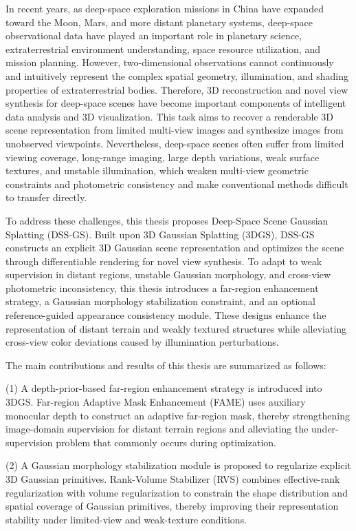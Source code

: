 \begin{engabstract}
    In recent years, as deep-space exploration missions in China have expanded toward the Moon, Mars, and more distant planetary systems, deep-space observational data have played an important role in planetary science, extraterrestrial environment understanding, space resource utilization, and mission planning. However, two-dimensional observations cannot continuously and intuitively represent the complex spatial geometry, illumination, and shading properties of extraterrestrial bodies. Therefore, 3D reconstruction and novel view synthesis for deep-space scenes have become important components of intelligent data analysis and 3D visualization. This task aims to recover a renderable 3D scene representation from limited multi-view images and synthesize images from unobserved viewpoints. Nevertheless, deep-space scenes often suffer from limited viewing coverage, long-range imaging, large depth variations, weak surface textures, and unstable illumination, which weaken multi-view geometric constraints and photometric consistency and make conventional methods difficult to transfer directly.

    To address these challenges, this thesis proposes Deep-Space Scene Gaussian Splatting (DSS-GS). Built upon 3D Gaussian Splatting (3DGS), DSS-GS constructs an explicit 3D Gaussian scene representation and optimizes the scene through differentiable rendering for novel view synthesis. To adapt to weak supervision in distant regions, unstable Gaussian morphology, and cross-view photometric inconsistency, this thesis introduces a far-region enhancement strategy, a Gaussian morphology stabilization constraint, and an optional reference-guided appearance consistency module. These designs enhance the representation of distant terrain and weakly textured structures while alleviating cross-view color deviations caused by illumination perturbations.
        
    The main contributions and results of this thesis are summarized as follows:

    (1) A depth-prior-based far-region enhancement strategy is introduced into 3DGS. Far-region Adaptive Mask Enhancement (FAME) uses auxiliary monocular depth to construct an adaptive far-region mask, thereby strengthening image-domain supervision for distant terrain regions and alleviating the under-supervision problem that commonly occurs during optimization.

    (2) A Gaussian morphology stabilization module is proposed to regularize explicit 3D Gaussian primitives. Rank-Volume Stabilizer (RVS) combines effective-rank regularization with volume regularization to constrain the shape distribution and spatial coverage of Gaussian primitives, thereby improving their representation stability under limited-view and weak-texture conditions.


\end{engabstract}
